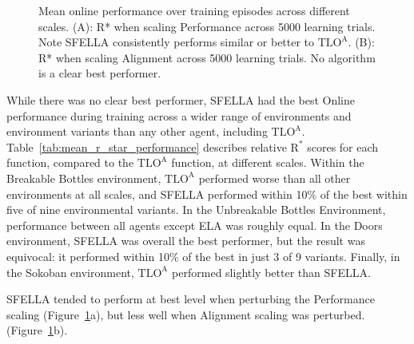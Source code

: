 \begin{figure}
  \caption{Mean online performance over training episodes across different scales. (A): R* when scaling Performance across 5000 learning trials. Note SFELLA consistently performs similar or better to $\text{TLO}^\text{A}$. (B): R* when scaling Alignment across 5000 learning trials. No algorithm is a clear best performer.%
  }
   \label{fig:online_performance}
 \end{figure}

While there was no clear best performer, SFELLA had the best Online performance during training across a wider range of environments and environment variants than any other agent, including  $\text{TLO}^\text{A}$. Table~\ref{tab:mean_r_star_performance} describes relative $\text{R}^*$ scores for each function, compared to the $\text{TLO}^\text{A}$ function, at different scales.  Within the Breakable Bottles environment, $\text{TLO}^\text{A}$ performed worse than all other environments at all scales, and SFELLA performed within 10\% of the best within five of nine environmental variants. In the Unbreakable Bottles Environment, performance between all agents except ELA was roughly equal. In the Doors environment, SFELLA was overall the best performer, but the result was equivocal: it performed within 10\% of the best in just 3 of 9 variants. Finally, in the Sokoban environment, $\text{TLO}^\text{A}$ performed slightly better than SFELLA.

SFELLA tended to perform at best level when perturbing the Performance scaling (Figure~\ref{fig:online_performance}a), but less well when Alignment scaling was perturbed. (Figure~\ref{fig:online_performance}b).